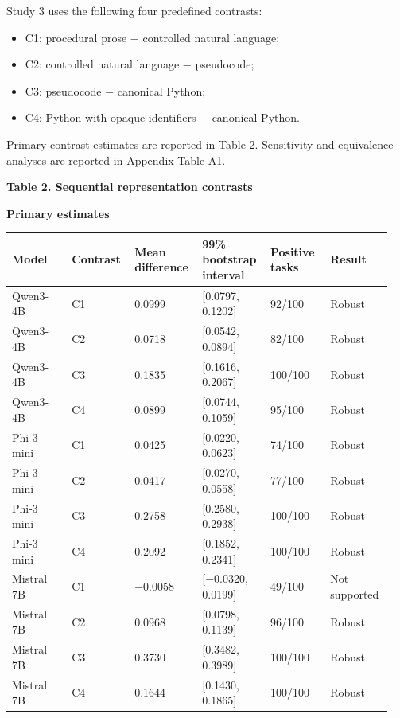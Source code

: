 \documentclass[sn-mathphys-num]{sn-jnl}
\begin{document}
Study 3 uses the following four predefined contrasts:

\begin{itemize}
\item C1: procedural prose $-$ controlled natural language;
\item C2: controlled natural language $-$ pseudocode;
\item C3: pseudocode $-$ canonical Python;
\item C4: Python with opaque identifiers $-$ canonical Python.
\end{itemize}

Primary contrast estimates are reported in Table 2. Sensitivity and equivalence analyses are reported in Appendix Table A1.

\textbf{Table 2. Sequential representation contrasts}

\textbf{Primary estimates}

\begin{table}[!htbp]
\centering\scriptsize
\begin{tabular}{|p{0.158\linewidth}|p{0.158\linewidth}|p{0.158\linewidth}|p{0.158\linewidth}|p{0.158\linewidth}|p{0.158\linewidth}|}
\hline
Model & Contrast & Mean difference & 99\% bootstrap interval & Positive tasks & Result \\ \hline
Qwen3-4B & C1 & 0.0999 & [0.0797, 0.1202] & 92/100 & Robust \\ \hline
Qwen3-4B & C2 & 0.0718 & [0.0542, 0.0894] & 82/100 & Robust \\ \hline
Qwen3-4B & C3 & 0.1835 & [0.1616, 0.2067] & 100/100 & Robust \\ \hline
Qwen3-4B & C4 & 0.0899 & [0.0744, 0.1059] & 95/100 & Robust \\ \hline
Phi-3 mini & C1 & 0.0425 & [0.0220, 0.0623] & 74/100 & Robust \\ \hline
Phi-3 mini & C2 & 0.0417 & [0.0270, 0.0558] & 77/100 & Robust \\ \hline
Phi-3 mini & C3 & 0.2758 & [0.2580, 0.2938] & 100/100 & Robust \\ \hline
Phi-3 mini & C4 & 0.2092 & [0.1852, 0.2341] & 100/100 & Robust \\ \hline
Mistral 7B & C1 & $-$0.0058 & [$-$0.0320, 0.0199] & 49/100 & Not supported \\ \hline
Mistral 7B & C2 & 0.0968 & [0.0798, 0.1139] & 96/100 & Robust \\ \hline
Mistral 7B & C3 & 0.3730 & [0.3482, 0.3989] & 100/100 & Robust \\ \hline
Mistral 7B & C4 & 0.1644 & [0.1430, 0.1865] & 100/100 & Robust \\ \hline
\end{tabular}
\end{table}
\end{document}
